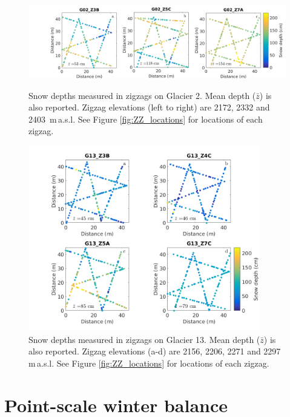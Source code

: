 \documentclass{sfuthesis}
\begin{document}
\begin{figure}[H]
	\centering
	\includegraphics[width = \textwidth]{ZigzagDepth_G02.png}\\
	\caption[Snow depths measured in zigzags on Glacier 2]{Snow depths measured in zigzags on Glacier 2. Mean depth ($\bar{z}$) is also reported. Zigzag elevations (left to right) are 2172, 2332 and 2403 \,m\,a.s.l. See Figure \ref{fig:ZZ_locations} for locations of each zigzag.}
	\label{fig:ZZ_G02}
\end{figure}

\begin{figure}[H] 
	\centering
	 \includegraphics[width=0.9\textwidth]{ZigzagDepth_G13.png}%
	\caption[Snow depths measured in zigzags on Glacier 13]{Snow depths measured in zigzags on Glacier 13. Mean depth ($\bar{z}$) is also reported. Zigzag elevations (a-d) are 2156, 2206, 2271 and 2297 \,m\,a.s.l. See Figure \ref{fig:ZZ_locations} for locations of each zigzag.}
	\label{fig:ZZ_G13}
\end{figure}


\section{Point-scale winter balance}
\end{document}
